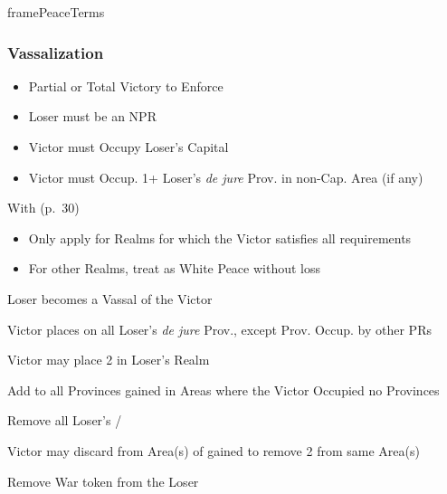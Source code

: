 \documentclass[10pt]{article}
\newlength{\fhPeaceTerms} \setlength\fhPeaceTerms{45.5\baselineskip}
\begin{document}
\begin{dynamiccontents*}{framePeaceTerms}
\begin{eubox}{\fhPeaceTerms}
\begin{multicols}{3}
		\subsubsection*{Vassalization}
		\begin{itemize}
			{
				\color{peaceReqColor}
				\item {}
				\begin{itemize}
					\item Partial or Total Victory to Enforce
					\item Loser must be an NPR
					\item Victor must Occupy Loser's Capital
					\item Victor must Occup. 1+ Loser's \emph{de jure} Prov. in non-Cap. Area (if any)
				\end{itemize}
			}
			\item With  (p.~30)
			\begin{itemize}
				\item Only apply for Realms for which the Victor satisfies all requirements
				\item For other Realms, treat as White Peace without \prestige loss
			\end{itemize}
			\item Loser becomes a Vassal of the Victor
			\item Victor places \vassalprovinces on all Loser's \emph{de jure} Prov., except Prov. Occup. by other PRs
			\item Victor may place 2 \influence in Loser's Realm
			\item Add \unrest to all Provinces gained in Areas where the Victor Occupied no Provinces
			\item Remove all Loser's \alliances/\marriages
			\item Victor may discard \claim from Area(s) of gained \vassalprovinces to remove 2 \unrest from same Area(s)
			\item Remove War token from the Loser
		\end{itemize}


\end{multicols}
\end{eubox}
\end{dynamiccontents*}
\end{document}
